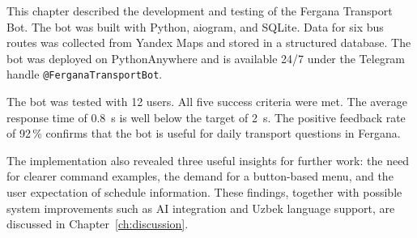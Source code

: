 This chapter described the development and testing of the Fergana Transport
Bot. The bot was built with Python, aiogram, and SQLite. Data for six bus
routes was collected from Yandex Maps and stored in a structured database.
The bot was deployed on PythonAnywhere and is available 24/7 under the
Telegram handle \texttt{@FerganaTransportBot}.

The bot was tested with 12 users. All five success criteria were met. The
average response time of 0.8~s is well below the target of 2~s. The
positive feedback rate of 92\,\% confirms that the bot is useful for daily
transport questions in Fergana.

The implementation also revealed three useful insights for further work:
the need for clearer command examples, the demand for a button-based menu,
and the user expectation of schedule information. These findings, together
with possible system improvements such as AI integration and Uzbek
language support, are discussed in Chapter~\ref{ch:discussion}.